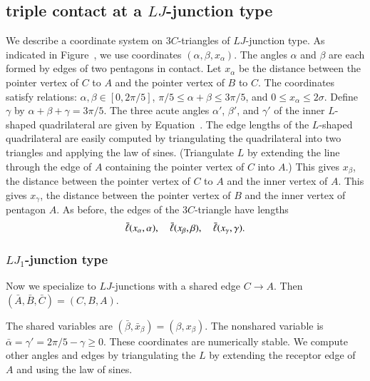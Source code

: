 \subsection{triple contact at a $LJ$-junction type}

We describe a coordinate system on $3C$-triangles of $LJ$-junction
type.  As indicated in Figure~, we use coordinates
$(\alpha,\beta,x_\alpha)$.  The angles $\alpha$ and $\beta$ are each
formed by edges of two pentagons in contact.  Let $x_\alpha$ be the
distance between the pointer vertex of $C$ to $A$ and the pointer
vertex of $B$ to $C$.  The coordinates satisfy relations:
$\alpha,\beta\in [0,2\pi/5]$, $\pi/5\le\alpha+\beta\le 3\pi/5$, and
$0\le x_\alpha\le 2\sigma$.  Define $\gamma$ by
$\alpha+\beta+\gamma=3\pi/5$.  The three acute angles $\alpha'$,
$\beta'$, and $\gamma'$ of the inner $L$-shaped quadrilateral are
given by Equation~.  The edge lengths of the $L$-shaped
quadrilateral are easily computed by triangulating the quadrilateral
into two triangles and applying the law of sines.  (Triangulate $L$ by
extending the line through the edge of $A$ containing the pointer
vertex of $C$ into $A$.)  This gives $x_\beta$, the distance between
the pointer vertex of $C$ to $A$ and the inner vertex of $A$.  This
gives $x_\gamma$, the distance between the pointer vertex of $B$ and
the inner vertex of pentagon $A$.  As before, the edges of the
$3C$-triangle have lengths
\[
\bar\ell(x_\alpha,\alpha),\quad \bar\ell(x_\beta,\beta),\quad \bar\ell(x_\gamma,\gamma).
\]


\subsubsection{$LJ_1$-junction type}

Now we specialize to $LJ$-junctions with a shared edge $C\to A$.
Then $(\bar A,\bar B,\bar C)=(C,B,A)$.

The shared variables are $(\bar \beta,\bar x_\beta)=(\beta,x_\beta)$.
The nonshared variable is $\bar\alpha=\gamma' = 2\pi/5-\gamma\ge0$.  These
coordinates are numerically stable.  We compute other angles and edges
by triangulating the $L$ by extending the receptor edge of $A$ and
using the law of sines.


